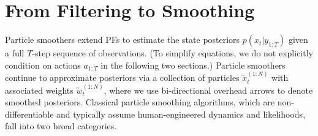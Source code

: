 


\section{From Filtering to Smoothing} \label{sec:from_filtering_to_smoothing}
    Particle smoothers extend PFs to estimate the state posteriors $p(x_t | y_{1:T})$ given a full $T$-step sequence of observations.  (To simplify equations, we do not explicitly condition on actions $a_{1:T}$ in the following two sections.) 
    Particle smoothers continue to approximate posteriors via a collection of particles $\overleftrightarrow{x}_{t}^{(1:N)}$ with associated weights $\overleftrightarrow{w}_{t}^{(1:N)}$, where we use bi-directional overhead arrows to denote smoothed posteriors.  Classical particle smoothing algorithms, which are non-differentiable and typically assume human-engineered dynamics and likelihoods, fall into two broad categories.  

